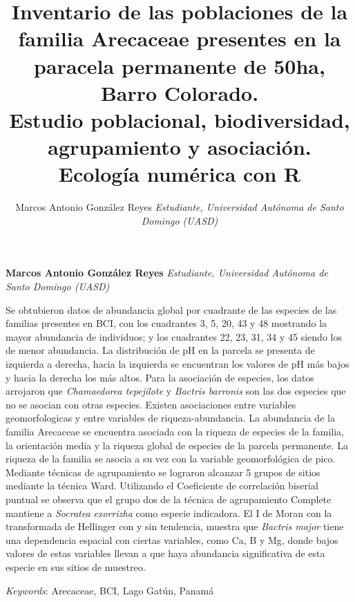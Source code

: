 \documentclass[11pt,]{article}
\title{Inventario de las poblaciones de la familia Arecaceae presentes en la
paracela permanente de 50ha, Barro Colorado.\\
Estudio poblacional, biodiversidad, agrupamiento y asociación.\\
Ecología numérica con R  }
\author{\Large Marcos Antonio González Reyes\vspace{0.05in} \newline\normalsize\emph{Estudiante, Universidad Autónoma de Santo Domingo (UASD)}  }
\date{}
\newcommand*{\authorfont}{\fontfamily{phv}\selectfont}
\renewenvironment{abstract}
 {{%
    \setlength{\leftmargin}{0mm}
    \setlength{\rightmargin}{\leftmargin}%
  }%
  \relax}
 {\endlist}
\begin{document}
	
%

{%
\setlength{\parindent}{0pt}
\thispagestyle{plain}
{\fontsize{18}{20}\selectfont\raggedright 
\maketitle  %

}

{
   \vskip 13.5pt\relax \normalsize\fontsize{11}{12} 
\textbf{\authorfont Marcos Antonio González Reyes} \hskip 15pt \emph{\small Estudiante, Universidad Autónoma de Santo Domingo (UASD)}   

}

}








\begin{abstract}

    \hbox{\vrule height .2pt width 39.14pc}

    \vskip 8.5pt %

\noindent Se obtubieron datos de abundancia global por cuadrante de las especies
de las familias presentes en BCI, con los cuadrantes 3, 5, 20, 43 y 48
mostrando la mayor abundancia de individuos; y los cuadrantes 22, 23,
31, 34 y 45 siendo los de menor abundancia. La distribución de pH en la
parcela se presenta de izquierda a derecha, hacia la izquierda se
encuentran los valores de pH más bajos y hacia la derecha los más altos.
Para la asociación de especies, los datos arrojaron que
\emph{Chamaedorea tepejilote} y \emph{Bactris barronis} son las dos
especies que no se asocian con otras especies. Existen asociaciones
entre variables geomorfologicas y entre variables de riqueza-abundancia.
La abundancia de la familia Arecaceae se encuentra asociada con la
riqueza de especies de la familia, la orientación media y la riqueza
global de especies de la parcela permanente. La riqueza de la familia se
asocia a su vez con la variable geomorfológica de pico. Mediante
técnicas de agrupamiento se lograron alcanzar 5 grupos de sitios
mediante la técnica Ward. Utilizando el Coeficiente de correlación
biserial puntual se observa que el grupo dos de la técnica de
agrupamiento Complete mantiene a \emph{Socratea exorrizha} como especie
indicadora. El I de Moran con la transformada de Hellinger con y sin
tendencia, muestra que \emph{Bactris major} tiene una dependencia
espacial con ciertas variables, como Ca, B y Mg, donde bajos valores de
estas variables llevan a que haya abundancia significativa de esta
especie en sus sitios de muestreo.


\vskip 8.5pt \noindent \emph{Keywords}: Arecaceae, BCI, Lago Gatún, Panamá \par

    \hbox{\vrule height .2pt width 39.14pc}



\end{abstract}
\end{document}
